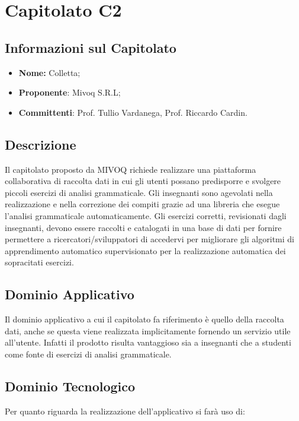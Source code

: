 \section{Capitolato C2}
\subsection{Informazioni sul Capitolato}
\begin{itemize}
	\item \textbf{Nome:} Colletta;
	\item \textbf{Proponente}: Mivoq S.R.L;
	\item \textbf{Committenti}: Prof. Tullio Vardanega, Prof. Riccardo Cardin.
\end{itemize}

\subsection{Descrizione}
Il capitolato proposto da MIVOQ richiede realizzare una piattaforma collaborativa di raccolta dati in cui gli utenti possano predisporre e svolgere piccoli esercizi di analisi grammaticale. Gli insegnanti sono agevolati nella realizzazione e nella correzione dei compiti grazie ad una libreria che esegue l’analisi grammaticale automaticamente.
Gli esercizi corretti, revisionati dagli insegnanti, devono essere raccolti e catalogati in una base di dati per fornire permettere a ricercatori/sviluppatori di accedervi per migliorare gli algoritmi di apprendimento automatico supervisionato per la realizzazione automatica dei sopracitati esercizi.


\subsection{Dominio Applicativo}
Il dominio applicativo a cui il capitolato fa riferimento è quello della raccolta dati, anche se questa viene realizzata implicitamente fornendo un servizio utile all’utente. Infatti il prodotto risulta vantaggioso sia a insegnanti che a studenti come fonte di esercizi di analisi grammaticale.

\subsection{Dominio Tecnologico}
Per quanto riguarda la realizzazione dell’applicativo si farà uso di:


